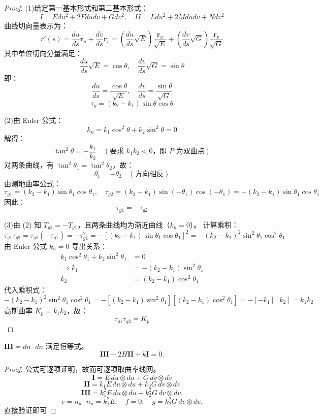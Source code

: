 \documentclass[lang=cn,10pt,thmcnt=section]{elegantbook}
\begin{document}
\begin{proof}
    (1)给定第一基本形式和第二基本形式：
    \[
    I = E  du^2 + 2F  du  dv + G  dv^2, \quad II = L  du^2 + 2M  du  dv + N  dv^2
    \]
    曲线切向量表示为：
    \[
    r'(s) = \frac{du}{ds} \mathbf{r}_u + \frac{dv}{ds} \mathbf{r}_v = \left( \frac{du}{ds} \sqrt{E} \right) \frac{\mathbf{r}_u}{\sqrt{E}} + \left( \frac{dv}{ds} \sqrt{G} \right) \frac{\mathbf{r}_v}{\sqrt{G}}
    \]
    其中单位切向分量满足：
    \[
    \frac{du}{ds} \sqrt{E} = \cos \theta, \quad \frac{dv}{ds} \sqrt{G} = \sin \theta
    \]
    即：
    \[
    \frac{du}{ds} = \frac{\cos \theta}{\sqrt{E}}, \quad \frac{dv}{ds} = \frac{\sin \theta}{\sqrt{G}}
    \]
    \[
    \tau_g = (k_2 - k_1) \sin \theta \cos \theta
    \]

    (2)由 Euler 公式：
    \[
    k_n = k_1 \cos^2 \theta + k_2 \sin^2 \theta = 0
    \]
    解得：
    \[
    \tan^2 \theta = -\frac{k_1}{k_2} \quad (\text{要求 } k_1 k_2 < 0 \text{，即 } P \text{ 为双曲点})
    \]
    对两条曲线，有 \( \tan^2 \theta_1 = \tan^2 \theta_2 \)，故：
    \[
    \theta_1 = -\theta_2 \quad (\text{方向相反})
    \]
    由测地曲率公式：
    \[
    \tau_{g1} = (k_2 - k_1) \sin \theta_1 \cos \theta_1, \quad \tau_{g2} = (k_2 - k_1) \sin(-\theta_1) \cos(-\theta_1) = -(k_2 - k_1) \sin \theta_1 \cos \theta_1
    \]
    因此：
    \[
    \tau_{g1} = -\tau_{g2}
    \]

    (3)由 (2) 知 \( T_{g2} = -T_{g1} \)，且两条曲线均为渐近曲线（\( k_n = 0 \)）。  
    计算乘积：
    \[
    \tau_{g1} \tau_{g2} = \tau_{g1} (-\tau_{g1}) = -\tau_{g1}^2 = - \left[ (k_2 - k_1) \sin \theta_1 \cos \theta_1 \right]^2 = - (k_2 - k_1)^2 \sin^2 \theta_1 \cos^2 \theta_1
    \]
    由 Euler 公式 \( k_n = 0 \) 导出关系：
    \begin{align*}
    k_1 \cos^2 \theta_1 + k_2 \sin^2 \theta_1 &= 0 \\
    \Rightarrow k_1 &= -(k_2 - k_1) \sin^2 \theta_1 \\
    k_2 &= (k_2 - k_1) \cos^2 \theta_1
    \end{align*}
    代入乘积式：
    \[
    - (k_2 - k_1)^2 \sin^2 \theta_1 \cos^2 \theta_1 = - \left[ (k_2 - k_1) \sin^2 \theta_1 \right] \left[ (k_2 - k_1) \cos^2 \theta_1 \right] = - \left[ -k_1 \right] \left[ k_2 \right] = k_1 k_2
    \]
    高斯曲率 \( K_p = k_1 k_2 \)，故：
    \[
    \tau_{g1} \tau_{g2} = K_p
    \]
\end{proof}
\begin{example}
    $\mathbf{III} = dn \cdot dn$ 满足恒等式。
\[
\mathbf{III} - 2H\mathbf{II} + k\mathbf{I} = 0.
\]
\end{example}
\begin{proof}
    公式可逐项证明，故而可逐项取曲率线网。
\[
\mathbf{I} = E \, du \otimes du + G \, dv \otimes dv
\]
\[
\mathbf{II} = k_1 E \, du \otimes du + k_2 G \, dv \otimes dv
\]
\[
\mathbf{III} = k_1^2 E \, du \otimes du + k_2^2 G \, dv \otimes dv.
\]
\[
e = n_u \cdot n_u = k_1^2 E, \quad f = 0, \quad g = k_2^2 G \, dv \otimes dv.
\]
    直接验证即可
\end{proof}
\end{document}
